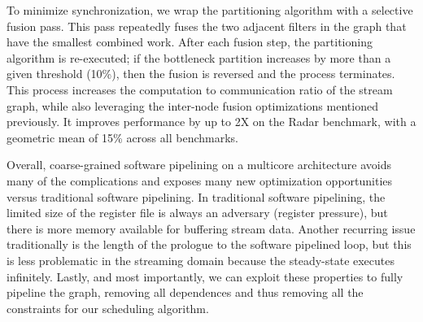To minimize synchronization, we wrap the partitioning algorithm with a
selective fusion pass.  This pass repeatedly fuses the two adjacent
filters in the graph that have the smallest combined work.  After each
fusion step, the partitioning algorithm is re-executed; if the
bottleneck partition increases by more than a given threshold (10\%),
then the fusion is reversed and the process terminates.  This process
increases the computation to communication ratio of the stream graph,
while also leveraging the inter-node fusion optimizations mentioned
previously.  It improves performance by up to 2X on the Radar
benchmark, with a geometric mean of 15\% across all benchmarks.

Overall, coarse-grained software pipelining on a multicore
architecture avoids many of the complications and exposes many new
optimization opportunities versus traditional software pipelining.  In
traditional software pipelining, the limited size of the register file
is always an adversary (register pressure), but there is more memory
available for buffering stream data.
Another recurring issue traditionally is the length of the prologue to
the software pipelined loop, but this is less problematic in the
streaming domain because the steady-state executes infinitely.
Lastly, and most importantly, we can exploit these properties to fully
pipeline the graph, removing all dependences and thus removing all the
constraints for our scheduling algorithm.


  
